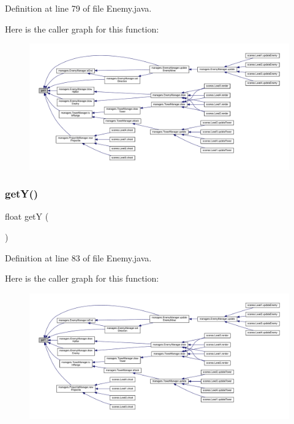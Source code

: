 Definition at line 79 of file Enemy.\+java.

Here is the caller graph for this function\+:
\nopagebreak
\begin{figure}[H]
\begin{center}
\leavevmode
\includegraphics[width=350pt]{classenemies_1_1_enemy_ae8f033a71b96920114aee202798dc7e9_icgraph}
\end{center}
\end{figure}
\mbox{\label{classenemies_1_1_enemy_aa0f539cec219900ff6cf76edcfa52367}} 
\subsubsection{\texorpdfstring{get\+Y()}{getY()}}
{\footnotesize\ttfamily float getY (\begin{DoxyParamCaption}{ }\end{DoxyParamCaption})}



Definition at line 83 of file Enemy.\+java.

Here is the caller graph for this function\+:
\nopagebreak
\begin{figure}[H]
\begin{center}
\leavevmode
\includegraphics[width=350pt]{classenemies_1_1_enemy_aa0f539cec219900ff6cf76edcfa52367_icgraph}
\end{center}
\end{figure}
\mbox{\label{classenemies_1_1_enemy_ab63593ba1faf08d9f9d69e1ec33c3caf}} 
